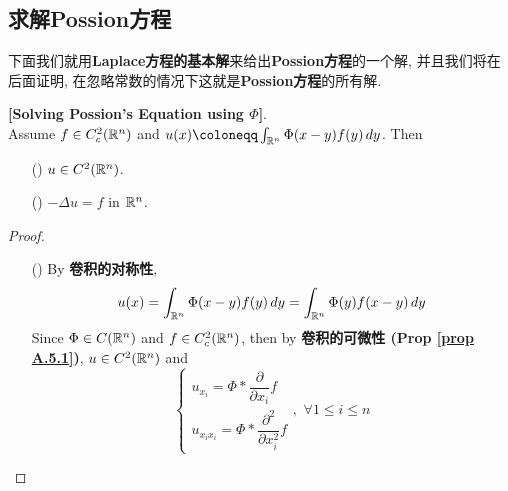 \newpage

\subsection{求解Possion方程}
	下面我们就用\textbf{Laplace方程的基本解}来给出\textbf{Possion方程}的一个解, 并且我们将在后面证明, 在忽略常数的情况下这就是\textbf{Possion方程}的所有解. 

	\vspace{1em}

	\begin{thm}\label{thm 2.1.1}
		\textbf{[Solving Possion's Equation using $\Phi$]}. \\
		Assume $f \in C_{c}^2 (\mathbb{R}^n)$ and $u(x) \coloneqq \int_{\R^n} \Phi(x - y) f(y) \, dy$. Then
		\begin{enumerate}
			\item[(\rmnum{1})] $u \in C^2 (\mathbb{R}^n)$. 
		
			\item[(\rmnum{2})] $- \Delta u = f$ in $\mathbb{R}^n$. 
		\end{enumerate}
		
		\vspace{4em}
		
		\begin{proof}
			\begin{enumerate}
				\item[(\rmnum{1})] By \textbf{卷积的对称性}, 
				\[ u(x) = \int_{\mathbb{R}^n} \Phi(x - y) f(y) \, dy = \int_{\mathbb{R}^n} \Phi(y) f(x - y) \, dy \]
				Since $\Phi \in C(\mathbb{R}^n)$ and $f \in C_{c}^2 (\mathbb{R}^n)$, then by \textbf{卷积的可微性 (Prop \ref{prop A.5.1})}, $u \in C^2 (\mathbb{R}^n)$ and
				\[ 
				\begin{cases}
					u_{x_i} = \Phi * \dfrac{\partial}{\partial x_i} f \\
					u_{x_i x_i} = \Phi * \dfrac{\partial^2}{\partial x_{i}^2} f
				\end{cases} , \,\, \forall 1 \leq i \leq n
				\]
				
				\vspace{2em}
				

\end{enumerate}
\end{proof}
\end{thm}
